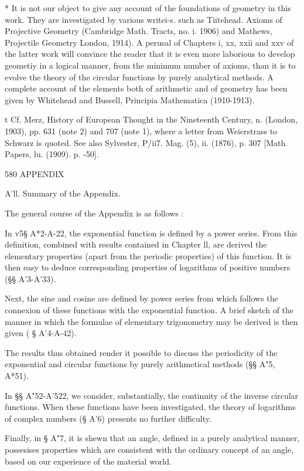* It is not our object to give any account of the foundations of
geometry in this work. They are investigated by various writei-s. such
as Tiitehead. Axioms of Projective Geometry (Cambridge Math. Tracts,
no. i. 1906) and Mathews, Projectile Geometry London, 1914). A perusal
of Chapters i, xx, xxii and xxv of the latter work will convince the
reader that it is even more laborious to develop geometiy in a logical
manner, from the minimum number of axioms, than it is to evolve the
theory of the circular functions by purely analytical methods. A
complete account of the elements both of arithmetic and of geometry
has been given by Whitehead and Bussell, Principia Mathematica
(1910-1913).

t Cf. Merz, History of European Thought in the Nineteenth Century, n.
(London, 1903), pp. 631 (note 2) and 707 (note 1), where a letter from
Weierstrass to Schwarz is quoted. See also Sylvester, P/ii7. Mag. (5),
ii. (1876), p. 307 [Math. Papers, lu. (1909). p. -50].



580 APPENDIX

A'll. Summary of the Appendix.

The general course of the Appendix is as follows :

In v5§ A*2-A-22, the exponential function is defined by a power
series. From this definition, combined with results contained in
Chapter ll, are derived the elementary properties (apart from the
periodic properties) of this function. It is then easy to deduce
corresponding properties of logarithms of positive numbers (§§
A'3-A'33).

Next, the sine and cosine are defined by power series from which
follows the connexion of these functions with the exponential
function. A brief sketch of the manner in which the formulae of
elementary trigonometry may be derived is then given ( § A'4-A-42).

The results thus obtained render it possible to discuss the
periodicity of the exponential and circular functions by purely
arithmetical methods (§§ A"5, A*51).

In §§ A"52-A'522, we consider, substantially, the continuity of the
inverse circular functions. When these functions have been
investigated, the theory of logarithms of complex numbers (§ A'6)
presents no further difficulty.

Finally, in § A"7, it is shewn that an angle, defined in a purely
analytical manner, possesises properties which are consistent with the
ordinary concept of an angle, based on our experience of the material
world.

